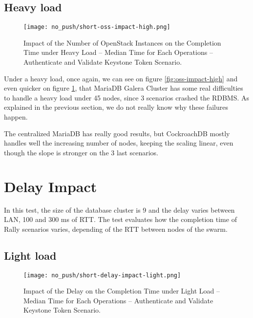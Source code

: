 \subsection{Heavy load}

\begin{figure}[H]
  \vspace{-10pt}
  \centering
  \centerline{\texttt{[image: no\_push/short-oss-impact-high.png]}}
  \vspace{-5pt}
  \caption{Impact of the Number of OpenStack Instances on the Completion Time under Heavy Load – Median Time for Each Operations – Authenticate and Validate Keystone Token Scenario.}
  \vspace{-5pt}
  \label{fig:short-oss-impact-high}
\end{figure}



Under a heavy load, once again, we can see on figure \ref{fig:oss-impact-high} and even quicker on figure \ref{fig:short-oss-impact-high}, that MariaDB Galera Cluster has some real difficulties to handle a heavy load under 45 nodes, since 3 scenarios crashed the RDBMS. As explained in the previous section, we do not really know why these failures happen.

The centralized MariaDB has really good results, but CockroachDB mostly handles well the increasing number of nodes, keeping the scaling linear, even though the slope is stronger on the 3 last scenarios.


\section{Delay Impact}

In this test, the size of the database cluster is 9 and the delay varies between LAN, 100 and 300 ms of RTT. The test evaluates how the completion time of Rally scenarios varies, depending of the RTT between nodes of the swarm.



\subsection{Light load}

\begin{figure}[H]
  \vspace{-10pt}
  \centering
  \centerline{\texttt{[image: no\_push/short-delay-impact-light.png]}}
  \vspace{-5pt}
  \caption{Impact of the Delay on the Completion Time under Light Load – Median Time for Each Operations – Authenticate and Validate Keystone Token Scenario.}
  \vspace{-5pt}
  \label{fig:short-delay-impact-light}
\end{figure}

